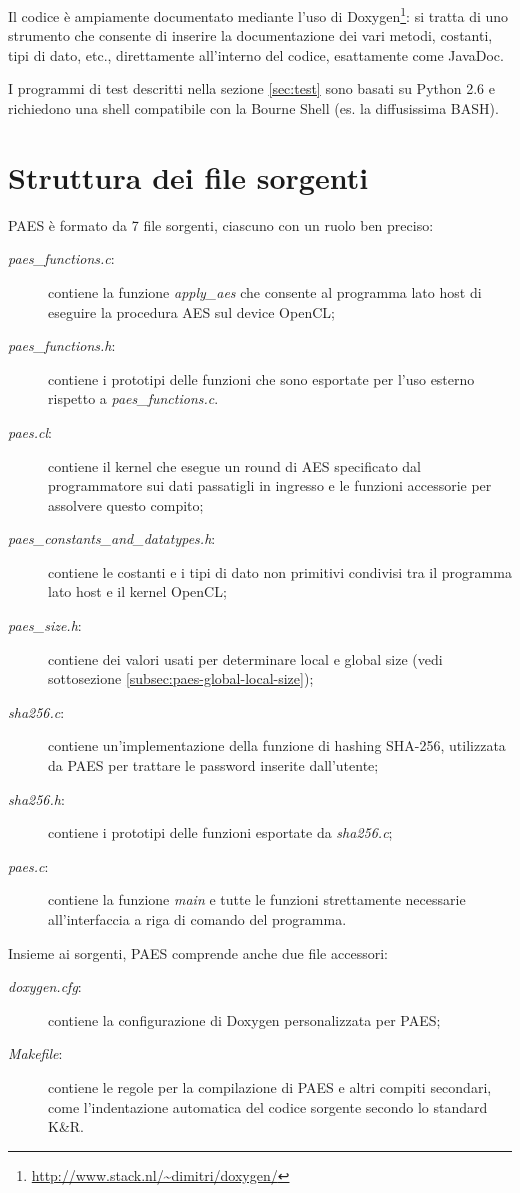 \documentclass[12pt,a4paper,oneside]{book}
\begin{document}
Il codice è ampiamente documentato mediante l'uso di Doxygen\footnote{\url{http://www.stack.nl/~dimitri/doxygen/}}: si tratta di uno strumento che consente di inserire la documentazione dei vari metodi, costanti, tipi di dato, etc., direttamente all'interno del codice, esattamente come JavaDoc.

I programmi di test descritti nella sezione \ref{sec:test} sono basati su Python 2.6 e richiedono una shell compatibile con la Bourne Shell (es. la diffusissima BASH).

\section{Struttura dei file sorgenti}
\label{sec:paes-files}

PAES è formato da 7 file sorgenti, ciascuno con un ruolo ben preciso:
\begin{description}
\item[\textit{paes\_functions.c}:] contiene la funzione \textit{apply\_aes} che consente al programma lato host di eseguire la procedura \ac{AES} sul device \ac{OpenCL};
\item[\textit{paes\_functions.h}:] contiene i prototipi delle funzioni che sono esportate per l'uso esterno rispetto a \textit{paes\_functions.c}.
\item[\textit{paes.cl}:] contiene il kernel che esegue un round di \ac{AES} specificato dal programmatore sui dati passatigli in ingresso e le funzioni accessorie per assolvere questo compito;
\item[\textit{paes\_constants\_and\_datatypes.h}:] contiene le costanti e i tipi di dato non primitivi condivisi tra il programma lato host e il kernel \ac{OpenCL};
\item[\textit{paes\_size.h}:] contiene dei valori usati per determinare local e global size (vedi sottosezione \ref{subsec:paes-global-local-size});
\item[\textit{sha256.c}:] contiene un'implementazione della funzione di hashing SHA-256, utilizzata da PAES per trattare le password inserite dall'utente;
\item[\textit{sha256.h}:] contiene i prototipi delle funzioni esportate da \textit{sha256.c};
\item[\textit{paes.c}:] contiene la funzione \textit{main} e tutte le funzioni strettamente necessarie all'interfaccia a riga di comando del programma.
\end{description}

Insieme ai sorgenti, PAES comprende anche due file accessori:
\begin{description}
\item[\textit{doxygen.cfg}:] contiene la configurazione di Doxygen personalizzata per PAES;
\item[\textit{Makefile}:] contiene le regole per la compilazione di PAES e altri compiti secondari, come l'indentazione automatica del codice sorgente secondo lo standard K\&R.
\end{description}
\end{document}
